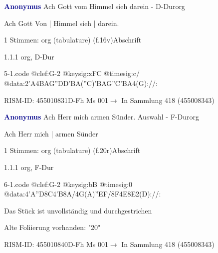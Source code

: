 \documentclass[twocolumn, 12pt]{book}
\begin{document}
\par \vspace{16pt} \textcolor{darkblue}{\textbf{Anonymus  }}\hfillplus{\textbf{[5]}}\newline Ach Gott vom Himmel sieh darein - D-Dur\newline org
\par \begin{itshape}[f.16v, at left:] Ach Gott Von | Himmel sieh | darein.\end{itshape} 
\par \textcolor{darkblue}{}  1 Stimmen: org (tabulature)  (f.16v)\newline Abschrift
\par 1.1.1  org, D-Dur  
\begin{filecontents*}{5-1.code}
@clef:G-2
@keysig:xFC
@timesig:c/
@data:2'A4BAG''DD'BA(''C)'BAG''C'BA4(G)://:
\end{filecontents*}
\newline %
\par RISM-ID: 455010831\newline D-Fh  Ms 001\newline $\rightarrow$ In Sammlung 418 (455008343)
      
\par \vspace{16pt} \textcolor{darkblue}{\textbf{Anonymus  }}\hfillplus{\textbf{[6]}}\newline Ach Herr mich armen Sünder. Auswahl - F-Dur\newline org
\par \begin{itshape}[f.20r, at left:] Ach Herr mich | armen Sünder\end{itshape} 
\par \textcolor{darkblue}{}  1 Stimmen: org (tabulature)  (f.20r)\newline Abschrift
\par 1.1.1  org, F-Dur  
\begin{filecontents*}{6-1.code}
@clef:G-2
@keysig:bB
@timesig:0
@data:4'A''D8C4'B8A/4G(A)''EF/8F4E8E2(D)://:
\end{filecontents*}
\newline %
\par Das Stück ist unvollständig und durchgestrichen
\par Alte Foliierung vorhanden: "20"
\par RISM-ID: 455010840\newline D-Fh  Ms 001\newline $\rightarrow$ In Sammlung 418 (455008343)
      
\end{document}
